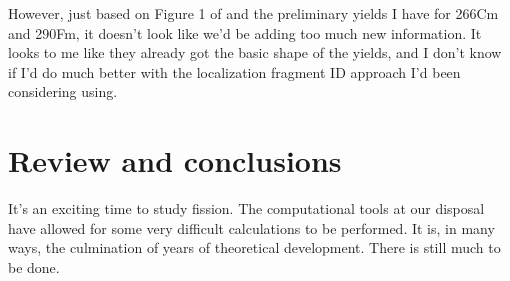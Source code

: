 However, just based on Figure 1 of \cite{Vassh2018} and the preliminary yields I have for 266Cm and 290Fm, it doesn't look like we'd be adding too much new information. It looks to me like they already got the basic shape of the yields, and I don't know if I'd do much better with the localization fragment ID approach I'd been considering using.

\section{Review and conclusions}
It's an exciting time to study fission. The computational tools at our disposal have allowed for some very difficult calculations to be performed. It is, in many ways, the culmination of years of theoretical development. There is still much to be done.
